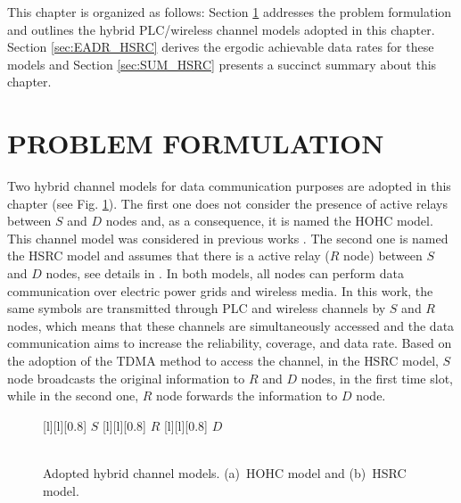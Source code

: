 This chapter is organized as follows: Section \ref{sec:ProbForm_HSRC} addresses the problem formulation and outlines the hybrid \ac{PLC}/wireless channel models adopted in this chapter. Section \ref{sec:EADR_HSRC} derives the ergodic achievable data rates for these models and Section \ref{sec:SUM_HSRC} presents a succinct summary about this chapter.

\section{PROBLEM FORMULATION} \label{sec:ProbForm_HSRC}

Two hybrid channel models for data communication purposes are adopted in this chapter (see Fig. \ref{fig:hybrid_models}). The first one does not consider the presence of active relays between $S$ and $D$ nodes and, as a consequence, it is named the \ac{HOHC} model. This channel model was considered in previous works \cite{Victor2016,Lai2012,Sayed2014,Lai2010}. The second one is named the \ac{HSRC} model and assumes that there is a active relay ($R$ node) between $S$ and $D$ nodes, see details in \cite{Victor2017,Victor2018,Leo2017}. In both models, all nodes can perform data communication over electric power grids and wireless media. In this work, the same symbols are transmitted through \ac{PLC} and wireless channels by $S$ and $R$ nodes, which means that these channels are simultaneously accessed and the data communication aims to increase the reliability, coverage, and data rate. Based on the adoption of the \ac{TDMA} method to access the channel, in the \ac{HSRC} model, $S$ node broadcasts the original information to $R$ and $D$ nodes, in the first time slot, while in the second one, $R$ node forwards the information to $D$ node.

\begin{figure}[b]
	\centering
	[l][0.8]{\color{white} $S$}
	[l][0.8]{\color{white} $R$}
	[l][0.8]{\color{white} $D$}
	\\~\\
	\caption[Adopted hybrid channel models.]{Adopted hybrid channel models. (a)~HOHC model and (b)~HSRC model.}
	\label{fig:hybrid_models}
\end{figure}

